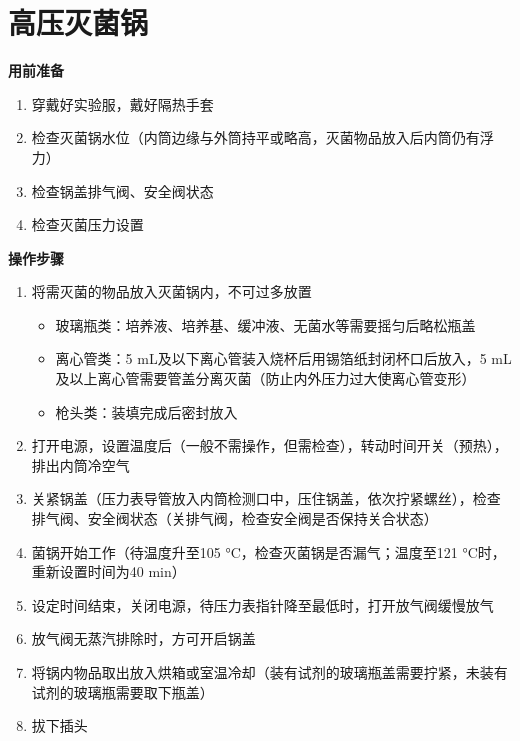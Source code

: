 \documentclass[
]{book}
\providecommand{\tightlist}{%
  \setlength{\itemsep}{0pt}\setlength{\parskip}{0pt}}
\begin{document}
\hypertarget{ux9ad8ux538bux706dux83ccux9505}{%
\section{高压灭菌锅}\label{ux9ad8ux538bux706dux83ccux9505}}

\textbf{用前准备}

\begin{enumerate}
\def\labelenumi{\arabic{enumi}.}
\tightlist
\item
  穿戴好实验服，戴好隔热手套
\item
  检查灭菌锅水位（内筒边缘与外筒持平或略高，灭菌物品放入后内筒仍有浮力）
\item
  检查锅盖排气阀、安全阀状态
\item
  检查灭菌压力设置
\end{enumerate}

\textbf{操作步骤}

\begin{enumerate}
\def\labelenumi{\arabic{enumi}.}
\tightlist
\item
  将需灭菌的物品放入灭菌锅内，不可过多放置

  \begin{itemize}
  \tightlist
  \item
    玻璃瓶类：培养液、培养基、缓冲液、无菌水等需要摇匀后略松瓶盖
  \item
    离心管类：5 mL及以下离心管装入烧杯后用锡箔纸封闭杯口后放入，5 mL及以上离心管需要管盖分离灭菌（防止内外压力过大使离心管变形）
  \item
    枪头类：装填完成后密封放入
  \end{itemize}
\item
  打开电源，设置温度后（一般不需操作，但需检查），转动时间开关（预热），排出内筒冷空气
\item
  关紧锅盖（压力表导管放入内筒检测口中，压住锅盖，依次拧紧螺丝），检查排气阀、安全阀状态（关排气阀，检查安全阀是否保持关合状态）
\item
  菌锅开始工作（待温度升至105 °C，检查灭菌锅是否漏气；温度至121 °C时，重新设置时间为40 min）
\item
  设定时间结束，关闭电源，待压力表指针降至最低时，打开放气阀缓慢放气
\item
  放气阀无蒸汽排除时，方可开启锅盖
\item
  将锅内物品取出放入烘箱或室温冷却（装有试剂的玻璃瓶盖需要拧紧，未装有试剂的玻璃瓶需要取下瓶盖）
\item
  拔下插头
\end{enumerate}
\end{document}
